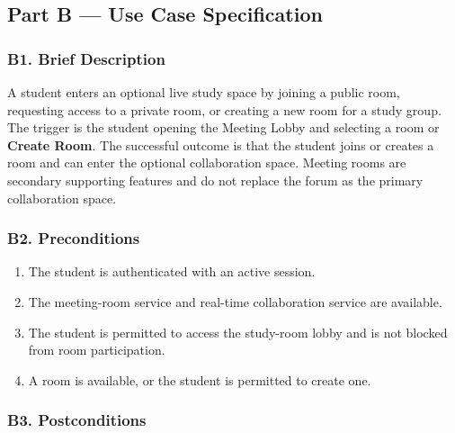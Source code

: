 \documentclass[12pt]{article}
\begin{document}
\subsection*{Part B --- Use Case Specification}
\par\medskip

\hypertarget{sec:b1-brief-description}{}
\subsubsection*{B1. Brief Description}
\par\medskip

A student enters an optional live study space by joining a public room, requesting access to a private room, or creating a new room for a study group. The trigger is the student opening the Meeting Lobby and selecting a room or \textbf{Create Room}. The successful outcome is that the student joins or creates a room and can enter the optional collaboration space. Meeting rooms are secondary supporting features and do not replace the forum as the primary collaboration space.
\par\medskip

\hypertarget{sec:b2-preconditions}{}
\subsubsection*{B2. Preconditions}
\par\medskip

\begin{enumerate}
\item The student is authenticated with an active session.
\item The meeting-room service and real-time collaboration service are available.
\item The student is permitted to access the study-room lobby and is not blocked from room participation.
\item A room is available, or the student is permitted to create one.
\end{enumerate}
\par\medskip

\hypertarget{sec:b3-postconditions}{}
\subsubsection*{B3. Postconditions}
\par\medskip
\end{document}
